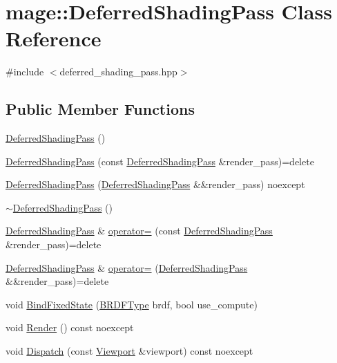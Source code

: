 \hypertarget{classmage_1_1_deferred_shading_pass}{}\section{mage\+:\+:Deferred\+Shading\+Pass Class Reference}
\label{classmage_1_1_deferred_shading_pass}


{\ttfamily \#include $<$deferred\+\_\+shading\+\_\+pass.\+hpp$>$}

\subsection*{Public Member Functions}
\begin{DoxyCompactItemize}
\item 
\hyperlink{classmage_1_1_deferred_shading_pass_a348c86ce12342110299739d8d63c6aaf}{Deferred\+Shading\+Pass} ()
\item 
\hyperlink{classmage_1_1_deferred_shading_pass_a4820a800b8ffc4cf0a7d155b09b71210}{Deferred\+Shading\+Pass} (const \hyperlink{classmage_1_1_deferred_shading_pass}{Deferred\+Shading\+Pass} \&render\+\_\+pass)=delete
\item 
\hyperlink{classmage_1_1_deferred_shading_pass_acb75d55c9072dd92c61f04a7573e0283}{Deferred\+Shading\+Pass} (\hyperlink{classmage_1_1_deferred_shading_pass}{Deferred\+Shading\+Pass} \&\&render\+\_\+pass) noexcept
\item 
\hyperlink{classmage_1_1_deferred_shading_pass_a0feba3a73c56e1c07abe19fddd890f76}{$\sim$\+Deferred\+Shading\+Pass} ()
\item 
\hyperlink{classmage_1_1_deferred_shading_pass}{Deferred\+Shading\+Pass} \& \hyperlink{classmage_1_1_deferred_shading_pass_afcb5b0299030a2a60dcb3685ca875e3e}{operator=} (const \hyperlink{classmage_1_1_deferred_shading_pass}{Deferred\+Shading\+Pass} \&render\+\_\+pass)=delete
\item 
\hyperlink{classmage_1_1_deferred_shading_pass}{Deferred\+Shading\+Pass} \& \hyperlink{classmage_1_1_deferred_shading_pass_a1a3ee174f93d538bd1c8c6a37f1e94f7}{operator=} (\hyperlink{classmage_1_1_deferred_shading_pass}{Deferred\+Shading\+Pass} \&\&render\+\_\+pass)=delete
\item 
void \hyperlink{classmage_1_1_deferred_shading_pass_a5e8abef0fb3e57f13d51f192dff74770}{Bind\+Fixed\+State} (\hyperlink{namespacemage_ae7a7a03a7b34d7e2689689bb8295cd38}{B\+R\+D\+F\+Type} brdf, bool use\+\_\+compute)
\item 
void \hyperlink{classmage_1_1_deferred_shading_pass_abc1566b2c89f2f043d6ec73f313e388a}{Render} () const noexcept
\item 
void \hyperlink{classmage_1_1_deferred_shading_pass_a37f010236b8c071f67fa33ec0daa75f7}{Dispatch} (const \hyperlink{classmage_1_1_viewport}{Viewport} \&viewport) const noexcept
\end{DoxyCompactItemize}
